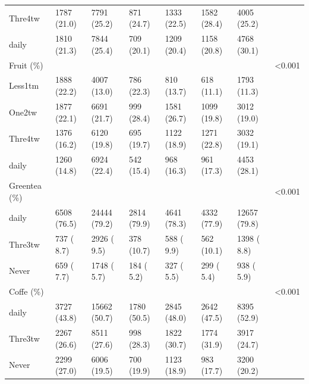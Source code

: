 \documentclass[]{tufte-handout}
\begin{document}
\begin{table}[!htbp]
\begin{tabular}[t]{llllllll}
\rowcolor{gray!6}  \hspace{1em}Thre4tw & 1787 (21.0) & 7791 (25.2) & 871 (24.7) & 1333 (22.5) & 1582 (28.4) & 4005 (25.2) & \\
\hspace{1em}daily & 1810 (21.3) & 7844 (25.4) & 709 (20.1) & 1209 (20.4) & 1158 (20.8) & 4768 (30.1) & \\
\rowcolor{gray!6}  Fruit (\%) &  &  &  &  &  &  & <0.001\\
\hspace{1em}Less1tm & 1888 (22.2) & 4007 (13.0) & 786 (22.3) & 810 (13.7) & 618 (11.1) & 1793 (11.3) & \\
\rowcolor{gray!6}  \hspace{1em}One2tw & 1877 (22.1) & 6691 (21.7) & 999 (28.4) & 1581 (26.7) & 1099 (19.8) & 3012 (19.0) & \\
\hspace{1em}Thre4tw & 1376 (16.2) & 6120 (19.8) & 695 (19.7) & 1122 (18.9) & 1271 (22.8) & 3032 (19.1) & \\
\rowcolor{gray!6}  \hspace{1em}daily & 1260 (14.8) & 6924 (22.4) & 542 (15.4) & 968 (16.3) & 961 (17.3) & 4453 (28.1) & \\
Greentea (\%) &  &  &  &  &  &  & <0.001\\
\rowcolor{gray!6}  \hspace{1em}daily & 6508 (76.5) & 24444 (79.2) & 2814 (79.9) & 4641 (78.3) & 4332 (77.9) & 12657 (79.8) & \\
\hspace{1em}Thre3tw & 737 ( 8.7) & 2926 ( 9.5) & 378 (10.7) & 588 ( 9.9) & 562 (10.1) & 1398 ( 8.8) & \\
\rowcolor{gray!6}  \hspace{1em}Never & 659 ( 7.7) & 1748 ( 5.7) & 184 ( 5.2) & 327 ( 5.5) & 299 ( 5.4) & 938 ( 5.9) & \\
Coffe (\%) &  &  &  &  &  &  & <0.001\\
\rowcolor{gray!6}  \hspace{1em}daily & 3727 (43.8) & 15662 (50.7) & 1780 (50.5) & 2845 (48.0) & 2642 (47.5) & 8395 (52.9) & \\
\hspace{1em}Thre3tw & 2267 (26.6) & 8511 (27.6) & 998 (28.3) & 1822 (30.7) & 1774 (31.9) & 3917 (24.7) & \\
\rowcolor{gray!6}  \hspace{1em}Never & 2299 (27.0) & 6006 (19.5) & 700 (19.9) & 1123 (18.9) & 983 (17.7) & 3200 (20.2) & \\

\end{tabular}
\end{table}
\end{document}

